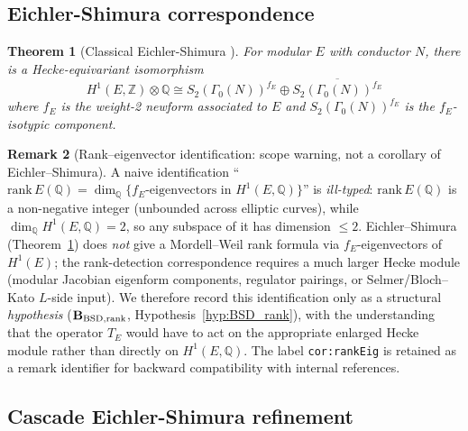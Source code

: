 \documentclass[11pt, a4paper]{amsart}
\newtheorem{theorem}{Theorem}[section]
\theoremstyle{definition}
\newtheorem{remark}[theorem]{Remark}
\newcommand{\Q}{\mathbb{Q}}
\newcommand{\Z}{\mathbb{Z}}
\begin{document}
\subsection{Eichler-Shimura correspondence}

\begin{theorem}[Classical Eichler-Shimura \cite{EichlerShimura}]\label{thm:ES}
For modular $E$ with conductor $N$, there is a Hecke-equivariant
isomorphism
\[
H^1(E, \Z) \otimes \Q \cong S_2(\Gamma_0(N))^{f_E} \oplus \overline{S_2(\Gamma_0(N))^{f_E}}
\]
where $f_E$ is the weight-2 newform associated to $E$ and
$S_2(\Gamma_0(N))^{f_E}$ is the $f_E$-isotypic component.
\end{theorem}

\begin{remark}[Rank--eigenvector identification: scope warning, not a corollary of Eichler--Shimura]\label{cor:rankEig}
A naive identification ``$\mathrm{rank}\, E(\Q) =
\dim_\Q\{f_E\text{-eigenvectors in } H^1(E,\Q)\}$'' is
\emph{ill-typed}: $\mathrm{rank}\, E(\Q)$ is a non-negative integer
(unbounded across elliptic curves), while
$\dim_\Q H^1(E,\Q) = 2$, so any subspace of it has dimension
$\leq 2$. Eichler--Shimura
(Theorem~\ref{thm:ES}) does \emph{not} give a Mordell--Weil rank
formula via $f_E$-eigenvectors of $H^1(E)$; the rank-detection
correspondence requires a much larger Hecke module
(modular Jacobian eigenform components, regulator pairings, or
Selmer/Bloch--Kato $L$-side input). We therefore record this
identification only as a structural \emph{hypothesis}
($\mathbf{B_{\rm BSD,rank}}$, Hypothesis~\ref{hyp:BSD_rank}),
with the understanding that the operator $T_E$ would have to act
on the appropriate enlarged Hecke module rather than directly on
$H^1(E,\Q)$. The label \texttt{cor:rankEig} is retained as a
remark identifier for backward compatibility with internal
references.
\end{remark}

\subsection{Cascade Eichler-Shimura refinement}
\end{document}
